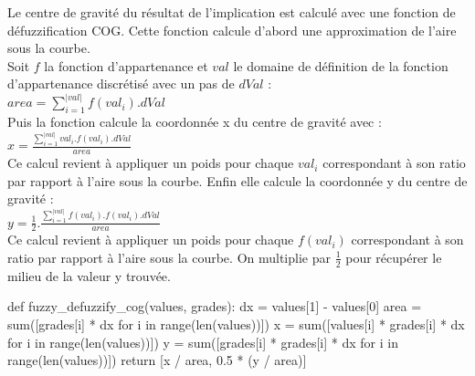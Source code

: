\documentclass[11pt]{report}
\begin{document}
Le centre de gravité du résultat de l'implication est calculé avec une fonction de défuzzification COG.
Cette fonction calcule d'abord une approximation de l'aire sous la courbe.\\
Soit $f$ la fonction d'appartenance et $val$ le domaine de définition de la fonction d'appartenance discrétisé avec un pas de $dVal$ :\\
$area = \sum_{i=1}^{|val|} f(val_i) . dVal$\\
Puis la fonction calcule la coordonnée x du centre de gravité avec :\\
$x = \frac{\sum_{i=1}^{|val|} val_i . f(val_i) . dVal}{area}$\\
Ce calcul revient à appliquer un poids pour chaque $val_i$ correspondant à son ratio par rapport à l'aire sous la courbe. Enfin elle calcule la coordonnée y du centre de gravité :\\
$y = \frac{1}{2} . \frac{\sum_{i=1}^{|val|} f(val_i) . f(val_i) . dVal}{area}$\\
Ce calcul revient à appliquer un poids pour chaque $f(val_i)$ correspondant à son ratio par rapport à l'aire sous la courbe. On multiplie par $\frac{1}{2}$ pour récupérer le milieu de la valeur y trouvée.
\begin{pythoncode}
def fuzzy_defuzzify_cog(values, grades):
	dx = values[1] - values[0]
	area = sum([grades[i] * dx for i in range(len(values))])
	x = sum([values[i] * grades[i] * dx for i in range(len(values))])
	y = sum([grades[i] * grades[i] * dx for i in range(len(values))])
	return [x / area, 0.5 * (y / area)]
\end{pythoncode}
\end{document}
